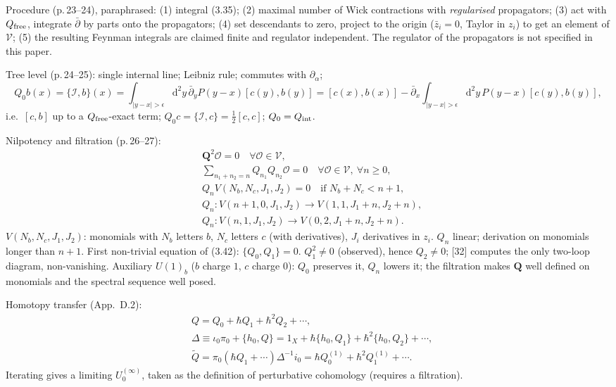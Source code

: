 \documentclass[11pt]{article}
\newcommand{\pb}{\bar{\partial}}
\newcommand{\cI}{\mathcal{I}}
\newcommand{\cO}{\mathcal{O}}
\newcommand{\bQ}{\mathbf{Q}}
\begin{document}
Procedure (p.\,23--24), paraphrased: (1) integral (3.35); (2) maximal number of Wick contractions with \emph{regularised} propagators; (3) act with $Q_{\rm free}$, integrate $\pb$ by parts onto the propagators; (4) set descendants to zero, project to the origin ($\bar z_i=0$, Taylor in $z_i$) to get an element of $\mathcal V$; (5) the resulting Feynman integrals are claimed finite and regulator independent. The regulator of the propagators is not specified in this paper.

Tree level (p.\,24--25): single internal line; Leibniz rule; commutes with $\partial_\alpha$;
\begin{equation}
Q_0b(x)=\{\cI,b\}(x)=\int_{|y-x|>\epsilon}\mathrm d^2y\,\pb_yP(y-x)[c(y),b(y)]=[c(x),b(x)]-\pb_x\int_{|y-x|>\epsilon}\mathrm d^2y\,P(y-x)[c(y),b(y)], \tag{3.39}
\end{equation}
i.e.\ $[c,b]$ up to a $Q_{\rm free}$-exact term; $Q_0c=\{\cI,c\}=\frac12[c,c]$; $Q_0=Q_{\rm int}$.

Nilpotency and filtration (p.\,26--27):
\begin{align}
&\bQ^2\cO=0\quad\forall\cO\in\mathcal V, \tag{3.41}\\
&\sum_{n_1+n_2=n}Q_{n_1}Q_{n_2}\cO=0\quad\forall\cO\in\mathcal V,\ \forall n\geq0, \tag{3.42}\\
&Q_nV(N_b,N_c,J_1,J_2)=0\quad\text{if }N_b+N_c<n+1, \tag{3.43}\\
&Q_n:V(n+1,0,J_1,J_2)\to V(1,1,J_1+n,J_2+n), \tag{3.44}\\
&Q_n:V(n,1,J_1,J_2)\to V(0,2,J_1+n,J_2+n). \tag{3.45}
\end{align}
$V(N_b,N_c,J_1,J_2)$: monomials with $N_b$ letters $b$, $N_c$ letters $c$ (with derivatives), $J_i$ derivatives in $z_i$. $Q_n$ linear; derivation on monomials longer than $n+1$. First non-trivial equation of (3.42): $\{Q_0,Q_1\}=0$. $Q_1^2\neq0$ (observed), hence $Q_2\neq0$; [32] computes the only two-loop diagram, non-vanishing. Auxiliary $U(1)_b$ ($b$ charge $1$, $c$ charge $0$): $Q_0$ preserves it, $Q_n$ lowers it; the filtration makes $\bQ$ well defined on monomials and the spectral sequence well posed.

Homotopy transfer (App.~D.2):
\begin{align}
&Q=Q_0+\hbar Q_1+\hbar^2Q_2+\cdots, \tag{D.13}\\
&\Delta\equiv\iota_0\pi_0+\{h_0,Q\}=1_X+\hbar\{h_0,Q_1\}+\hbar^2\{h_0,Q_2\}+\cdots, \tag{D.14}\\
&\tilde Q=\pi_0(\hbar Q_1+\cdots)\Delta^{-1}i_0=\hbar Q^{(1)}_0+\hbar^2Q^{(1)}_1+\cdots. \tag{D.15}
\end{align}
Iterating gives a limiting $U_0^{(\infty)}$, taken as the definition of perturbative cohomology (requires a filtration).
\end{document}
